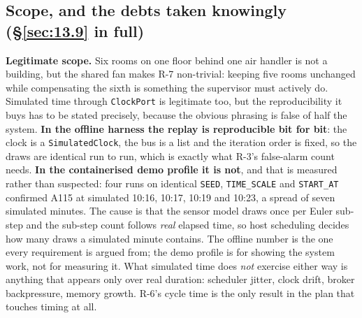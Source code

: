 \subsection{Scope, and the debts taken knowingly (\texorpdfstring{\S\ref{sec:13.9}}{13.9} in full)}\label{sec:I.6}

\textbf{Legitimate scope.} Six rooms on one floor behind one air handler is not a building, but the
shared fan makes R-7 non-trivial: keeping five rooms unchanged while compensating the sixth is
something the supervisor must actively do. Simulated time through \texttt{ClockPort} is legitimate
too, but the reproducibility it buys has to be stated precisely, because the obvious phrasing is
false of half the system. \textbf{In the offline harness the replay is reproducible bit for bit}:
the clock is a \texttt{SimulatedClock}, the bus is a list and the iteration order is fixed, so the
draws are identical run to run, which is exactly what R-3's false-alarm count needs.
\textbf{In the containerised demo profile it is not}, and that is measured rather than suspected:
four runs on identical \texttt{SEED}, \texttt{TIME\_SCALE} and \texttt{START\_AT} confirmed A115 at
simulated 10:16, 10:17, 10:19 and 10:23, a spread of seven simulated minutes. The cause is that
the sensor model draws once per Euler sub-step and the sub-step count follows \emph{real} elapsed
time, so host scheduling decides how many draws a simulated minute contains. The offline number is
the one every requirement is argued from; the demo profile is for showing the system work, not for
measuring it. What simulated time does \emph{not} exercise either way is anything that
appears only over real duration: scheduler jitter, clock drift, broker backpressure, memory growth.
R-6's cycle time is the only result in the plan that touches timing at all.

